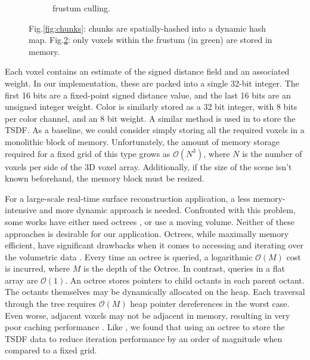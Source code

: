 \documentclass[conference]{IEEEtran}
\newcommand{\figref}[1]{Fig.\ref{#1}}
\newcommand{\TSDF}{TSDF\xspace}
\begin{document}
\begin{figure}[t!]
\begin{subfigure}{0.475\columnwidth}
	      \caption{frustum culling.}
	 	 \label{fig:frustum_cull}
	  \end{subfigure}
	  \caption{\figref{fig:chunks}: chunks are spatially-hashed \cite{SpatialHashing} into a
      dynamic hash map. 
      \figref{fig:frustum_cull}: only voxels within the frustum (in green) are stored in memory.}
\end{figure} 

Each voxel contains an estimate of the signed distance field and an
associated weight. In our implementation, these are packed into a single 32-bit
integer. The first 16 bits are a fixed-point signed distance value, and the
last 16 bits  are an unsigned integer weight. Color is similarly
stored as a 32 bit integer, with 8 bits per color channel, and an 8 bit weight.
A similar method is used in \cite{Newcombe, Whelan2013, Bylow2013, NiessnerHashing} to store
the \TSDF. As a baseline, we could consider simply storing all the required
voxels in a monolithic block of memory. Unfortunately, the amount of memory storage required
for a fixed grid of this type grows as $\mathcal{O}(N^3)$, where $N$ is the
number of voxels per side of the 3D voxel array. Additionally, if the size of
the scene isn't known beforehand, the memory block must be resized.


For a large-scale real-time surface reconstruction application, a less
memory-intensive and more dynamic approach is needed. Confronted with this
problem, some works have either used  octrees \cite{Wurm2010, Zeng2012,
Chen2012}, or use a moving volume\cite{Whelan2013}. Neither of these approaches
is desirable for our application. Octrees, while maximally memory efficient,
have significant drawbacks when it comes to accessing and iterating over the
volumetric data \cite{NiessnerHashing}. Every time an octree is queried,  a
logarithmic $\mathcal{O}(M)$ cost is incurred, where $M$ is the depth of the
Octree. In contrast, queries in a flat array are $\mathcal{O}(1)$. An octree
stores pointers to child octants in each parent octant. The octants themselves
may be dynamically allocated on the heap. Each traversal through the tree
requires $\mathcal{O}(M)$ heap pointer dereferences in the worst case.
Even worse, adjacent voxels may not be adjacent in memory, resulting in very
poor caching performance \cite{CacheStructures}.  Like \cite{NiessnerHashing},
we found that using an octree to store the \TSDF data to reduce iteration
performance by an order of magnitude when compared to a fixed grid.
\end{document}

